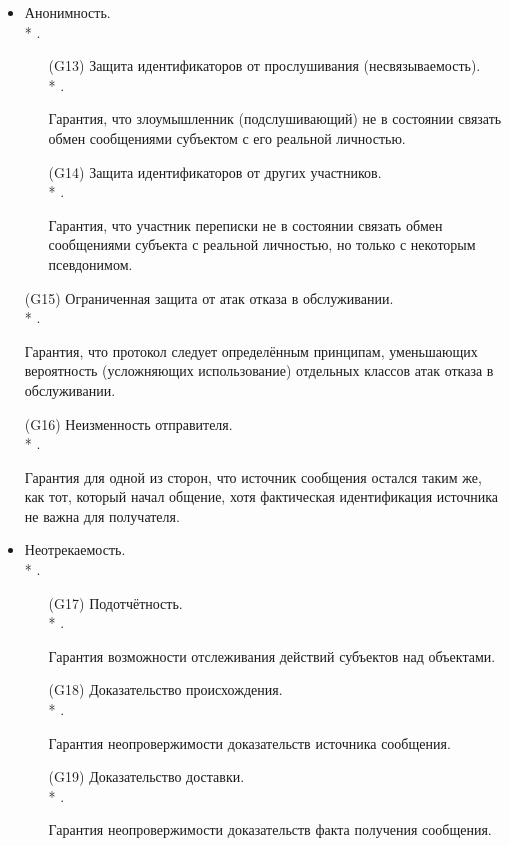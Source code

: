 \begin{itemize}
	\item Анонимность.\\*
		.
	\begin{itemize}
		\item[(G13)] Защита идентификаторов от прослушивания (несвязываемость).\\*
			.
		\item[{}] Гарантия, что злоумышленник (подслушивающий) не в состоянии связать обмен сообщениями субъектом с его реальной личностью.
		\item[(G14)] Защита идентификаторов от других участников.\\*
			.
		\item[{}] Гарантия, что участник переписки не в состоянии связать обмен сообщениями субъекта с реальной личностью, но только с некоторым псевдонимом.
	\end{itemize}

	\item[(G15)] Ограниченная защита от атак отказа в обслуживании.\\*
		.
	\item[{}] Гарантия, что протокол следует определённым принципам, уменьшающих вероятность (усложняющих использование) отдельных классов атак отказа в обслуживании.

	\item[(G16)] Неизменность отправителя.\\*
		.
	\item[{}] Гарантия для одной из сторон, что источник сообщения остался таким же, как тот, который начал общение, хотя фактическая идентификация источника не важна для получателя.

	\item Неотрекаемость.\\*
		.
	\begin{itemize}
		\item[(G17)] Подотчётность.\\*
			.
		\item[{}] Гарантия возможности отслеживания действий субъектов над объектами.
		\item[(G18)] Доказательство происхождения.\\*
			.
		\item[{}] Гарантия неопровержимости доказательств источника сообщения.
		\item[(G19)] Доказательство доставки.\\*
			.
		\item[{}] Гарантия неопровержимости доказательств факта получения сообщения.
	\end{itemize}


\end{itemize}
